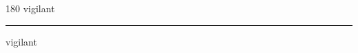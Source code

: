 
\begin{frame}
\begin{center}
\begin{turn}{180}
{\fontsize{2.5cm}{1em}\selectfont vigilant}
\end{turn}
\vspace{1em}\par  
\hrule
\vspace{1em}\par  
{\fontsize{2.5cm}{1em}\selectfont vigilant}
\end{center}
\end{frame}

